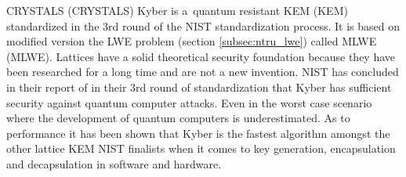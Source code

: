 CRYSTALS (\acl{CRYSTALS}) Kyber is a~quantum resistant KEM (\acl{KEM}) standardized in the 3rd round of the NIST standardization process. It is based on modified version the LWE problem (section \ref{subsec:ntru_lwe}) called MLWE (\acl{MLWE}). Lattices have a solid theoretical security foundation because they have been researched for a long time and are not a new invention. NIST has concluded in their report of in their 3rd round of standardization that Kyber has sufficient security against quantum computer attacks. Even in the worst case scenario where the development of quantum computers is underestimated. As to performance it has been shown that Kyber is the fastest algorithm amongst the other lattice KEM NIST finalists when it comes to key generation, encapsulation and decapsulation in software and hardware. \cite{Grimes2020}\cite{Alagic2022}

